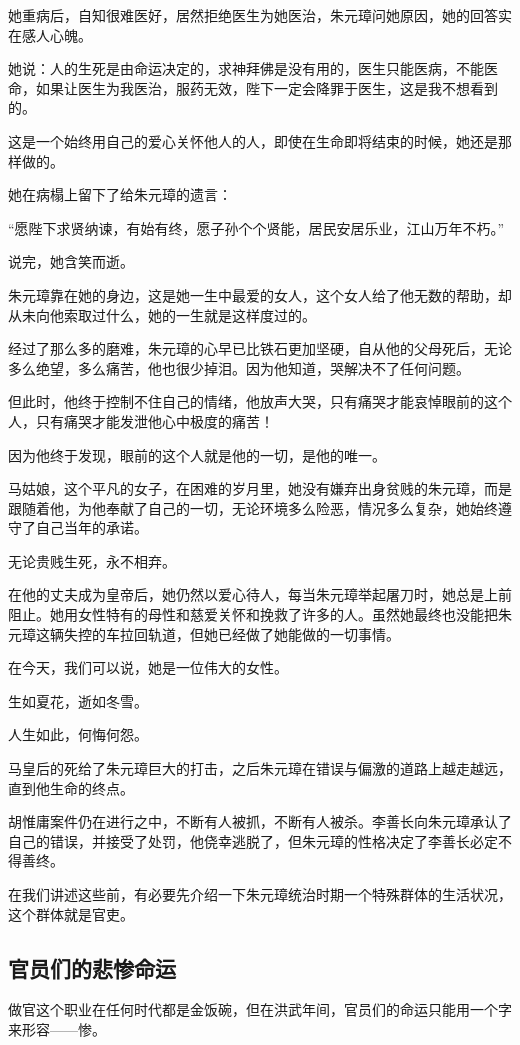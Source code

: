 \begin{multicols}{\theparacolNo}
		她重病后，自知很难医好，居然拒绝医生为她医治，朱元璋问她原因，她的回答实在感人心魄。

		她说：人的生死是由命运决定的，求神拜佛是没有用的，医生只能医病，不能医命，如果让医生为我医治，服药无效，陛下一定会降罪于医生，这是我不想看到的。

		这是一个始终用自己的爱心关怀他人的人，即使在生命即将结束的时候，她还是那样做的。

		她在病榻上留下了给朱元璋的遗言：

		“愿陛下求贤纳谏，有始有终，愿子孙个个贤能，居民安居乐业，江山万年不朽。”

		说完，她含笑而逝。

		朱元璋靠在她的身边，这是她一生中最爱的女人，这个女人给了他无数的帮助，却从未向他索取过什么，她的一生就是这样度过的。

		经过了那么多的磨难，朱元璋的心早已比铁石更加坚硬，自从他的父母死后，无论多么绝望，多么痛苦，他也很少掉泪。因为他知道，哭解决不了任何问题。

		但此时，他终于控制不住自己的情绪，他放声大哭，只有痛哭才能哀悼眼前的这个人，只有痛哭才能发泄他心中极度的痛苦！

		因为他终于发现，眼前的这个人就是他的一切，是他的唯一。

		马姑娘，这个平凡的女子，在困难的岁月里，她没有嫌弃出身贫贱的朱元璋，而是跟随着他，为他奉献了自己的一切，无论环境多么险恶，情况多么复杂，她始终遵守了自己当年的承诺。

		无论贵贱生死，永不相弃。

		在他的丈夫成为皇帝后，她仍然以爱心待人，每当朱元璋举起屠刀时，她总是上前阻止。她用女性特有的母性和慈爱关怀和挽救了许多的人。虽然她最终也没能把朱元璋这辆失控的车拉回轨道，但她已经做了她能做的一切事情。

		在今天，我们可以说，她是一位伟大的女性。

		生如夏花，逝如冬雪。

		人生如此，何悔何怨。

		马皇后的死给了朱元璋巨大的打击，之后朱元璋在错误与偏激的道路上越走越远，直到他生命的终点。

		胡惟庸案件仍在进行之中，不断有人被抓，不断有人被杀。李善长向朱元璋承认了自己的错误，并接受了处罚，他侥幸逃脱了，但朱元璋的性格决定了李善长必定不得善终。

		在我们讲述这些前，有必要先介绍一下朱元璋统治时期一个特殊群体的生活状况，这个群体就是官吏。

		\subsection{官员们的悲惨命运}
		做官这个职业在任何时代都是金饭碗，但在洪武年间，官员们的命运只能用一个字来形容——惨。


\end{multicols}
